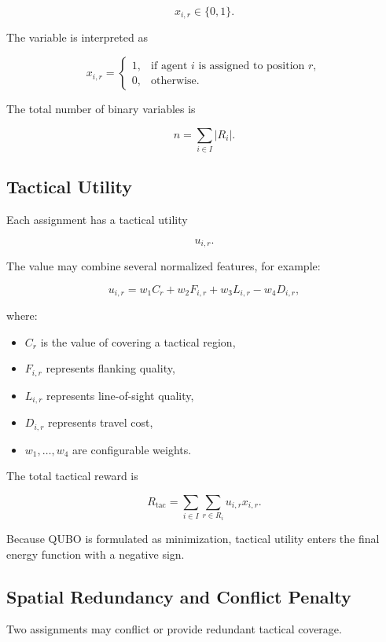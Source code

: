 \documentclass[12pt, a4paper]{article}
\begin{document}
$$
x_{i,r}\in\{0,1\}.
$$

The variable is interpreted as

$$
x_{i,r}
=
\begin{cases}
1, & \text{if agent } i \text{ is assigned to position } r,\\
0, & \text{otherwise}.
\end{cases}
$$

The total number of binary variables is

$$
n=\sum_{i\in I}|R_i|.
$$

\subsection*{Tactical Utility}

Each assignment has a tactical utility

$$
u_{i,r}.
$$

The value may combine several normalized features, for example:

$$
u_{i,r}
=
w_1 C_{r}
+
w_2 F_{i,r}
+
w_3 L_{i,r}
-
w_4 D_{i,r},
$$

where:

\begin{itemize}
\item $C_r$ is the value of covering a tactical region,
\item $F_{i,r}$ represents flanking quality,
\item $L_{i,r}$ represents line-of-sight quality,
\item $D_{i,r}$ represents travel cost,
\item $w_1,\ldots,w_4$ are configurable weights.
\end{itemize}

The total tactical reward is

$$
R_{\text{tac}}
=
\sum_{i\in I}
\sum_{r\in R_i}
u_{i,r}x_{i,r}.
$$

Because QUBO is formulated as minimization, tactical utility enters the final energy function with a negative sign.

\subsection*{Spatial Redundancy and Conflict Penalty}

Two assignments may conflict or provide redundant tactical coverage.
\end{document}
